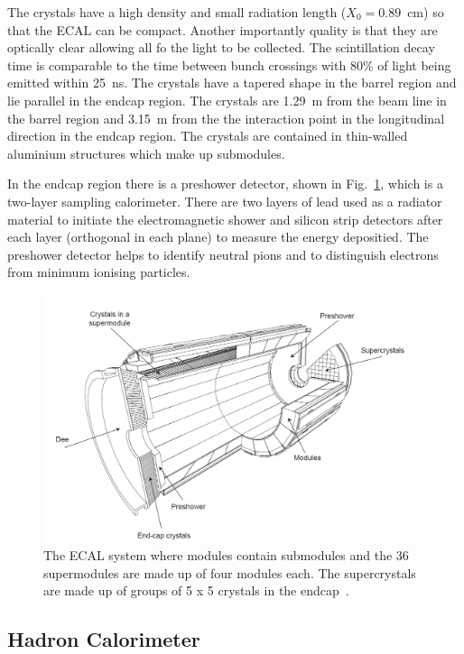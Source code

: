 The crystals have a high density and small radiation length ($X_{0}=0.89$~cm) so that the ECAL can be compact. Another importantly quality is that they are optically clear allowing all fo the light to be collected. The scintillation decay time is comparable to the time between bunch crossings with 80\% of light being emitted within 25~ns. The crystals have a tapered shape in the barrel region and lie parallel in the endcap region. The crystals are 1.29~m from the beam line in the barrel region and 3.15~m from the the interaction point in the longitudinal direction in the endcap region. The crystals are contained in thin-walled aluminium structures which make up submodules.

In the endcap region there is a preshower detector, shown in Fig.~\ref{fig:ecal}, which is a two-layer sampling calorimeter. There are two layers of lead used as a radiator material to initiate the electromagnetic shower and silicon strip detectors after each layer (orthogonal in each plane) to measure the energy depositied. The preshower detector helps to identify neutral pions and to distinguish electrons from minimum ionising particles.

\begin{figure}[ht!]
\centering
    \includegraphics[width=0.95\textwidth]{images/ecal.png}
    \caption{The ECAL system where modules contain submodules and the 36 supermodules are made up of four modules each. The supercrystals are made up of groups of 5 x 5 crystals in the endcap~\cite{Isildak:2013kfa}.}
    \label{fig:ecal}
\end{figure}

\subsection{Hadron Calorimeter}

